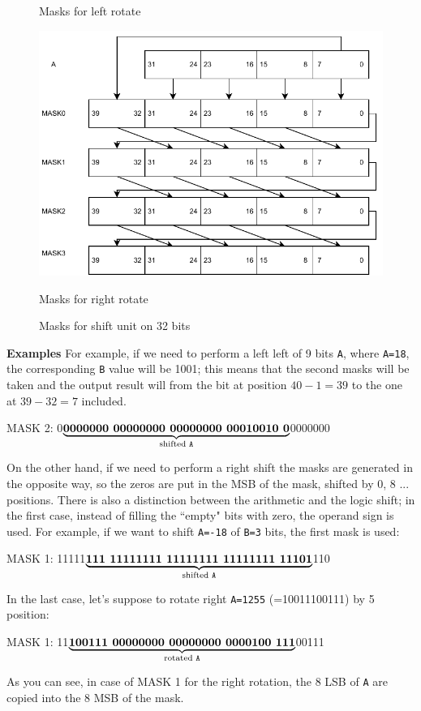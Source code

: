 \begin{figure}[h]
\begin{minipage}[b]{0.5\linewidth}
        \caption{Masks for left rotate} 
        \vspace{4ex}
    \end{minipage}%
    \begin{minipage}[b]{0.5\linewidth}
        \centering
        \includegraphics[width=.78\linewidth]{chapters/5_ExecuteStage/images/right_rotate.pdf} 
        \caption{Masks for right rotate} 
        \vspace{4ex}
    \end{minipage} 
    \caption{Masks for shift unit on 32 bits} 
\end{figure}
\begin{mybox}
    \textbf{Examples}
    \newline
    For example, if we need to perform a left left of 9 bits \texttt{A}, where \texttt{A=18}, the corresponding \texttt{B} value will be 1001; this means that the second masks will be taken and the output result will from the bit at position $40-1=39$ to the one at $39-32=7$ included.
    \begin{center}
        MASK 2: 0$\underbrace{\textbf{0000000 00000000 00000000 00010010 0}}_{\text{shifted \texttt{A}}}$0000000
    \end{center}
    
    On the other hand, if we need to perform a right shift the masks are generated in the opposite way, so the zeros are put in the MSB of the mask, shifted by 0, 8 ... positions. There is also a distinction between the arithmetic and the logic shift; in the first case, instead of filling the ``empty" bits with zero, the operand sign is used. For example, if we want to shift \texttt{A=-18} of \texttt{B=3} bits, the first mask is used: 
    \begin{center}
        MASK 1: 11111$\underbrace{\textbf{111 11111111 11111111 11111111 11101}}_{\text{shifted \texttt{A}}}$110
    \end{center}
    
    In the last case, let's suppose to rotate right \texttt{A=1255} (=10011100111) by 5 position:
    \begin{center}
        MASK 1: 11$\underbrace{\textbf{100111 00000000 00000000 0000100 111}}_{\text{rotated \texttt{A}}}$00111
    \end{center}
    As you can see, in case of MASK 1 for the right rotation, the 8 LSB of \texttt{A} are copied into the 8 MSB of the mask.
\end{mybox}
    

